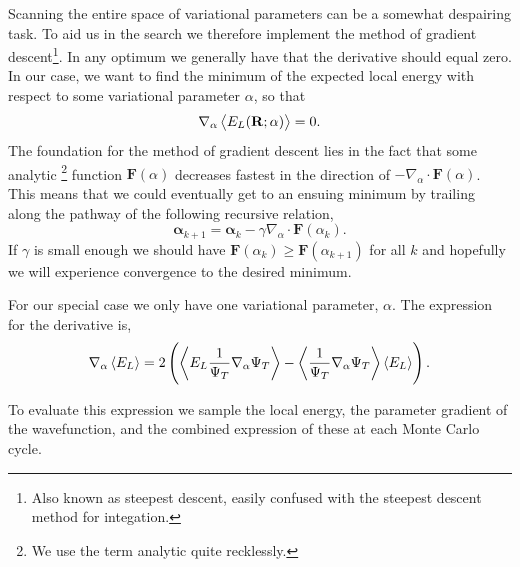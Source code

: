 \documentclass[
    a4paper, aps, twocolumn, floatfix, superscriptaddress,
    nofootinbib]{revtex4-1}
\newcommand{\vf}{\mathbf}
\newcommand{\vfg}{\boldsymbol}
\newcommand{\1}{\mathds{1}}
\begin{document}
            Scanning the entire space of variational parameters can be a
            somewhat despairing task. To aid us in the search we therefore
            implement the method of gradient descent\footnote{Also known as
            steepest descent, easily confused with the steepest descent method
            for integation.}. In any optimum we generally have that the
            derivative should equal zero. In our case, we want to find the
            minimum of the expected local energy with respect to some
            variational parameter $\alpha$, so that
            \begin{equation}
                \nabla_\alpha \expval{E_L(\mathbf{R}; \alpha)} = 0.
            \end{equation}
            The foundation for  the method of gradient descent lies in the fact
            that some analytic \footnote{We use the term analytic quite
            recklessly.} function $\vf{F}(\alpha)$ decreases fastest in the direction
            of $-\nabla_\alpha \cdot \vf{F}(\alpha)$. This means that we could eventually
            get to an ensuing minimum by trailing along the pathway of the
            following recursive relation,
            \begin{equation}
                \vfg{\alpha}_{k+1}
                = \vfg{\alpha}_k - \gamma \nabla_{\alpha}\cdot \vf{F}(\alpha_k).
                \label{eq:parameter_difference}
            \end{equation}
            If $\gamma$ is small enough we should have $\vf{F}(\alpha_k) \geq
            \vf{F}(\alpha_{k+1})$ for all $k$ and hopefully we will experience
            convergence to the desired minimum.

            For our special case we only have one variational parameter,
            $\alpha$.  The expression for the derivative is,
            \begin{align}
                \nabla_{\alpha}\expval{E_L}
                =
                2\left(
                    \expval{E_L\frac{1}{\Psi_T}\nabla_{\alpha}\Psi_T}
                    - \expval{\frac{1}{\Psi_T} \nabla_{\alpha}\Psi_T}
                    \expval{E_L}
                \right).
                \label{eq:variational_parameter_gradient}
            \end{align}

            To evaluate this expression we sample the local energy, the
            parameter gradient of the wavefunction, and the combined expression
             of these at each Monte Carlo cycle.
\end{document}
